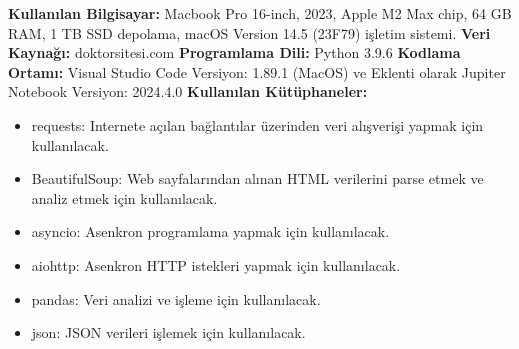 \textbf{Kullanılan Bilgisayar:} Macbook Pro 16-inch, 2023, Apple M2 Max chip, 64 GB RAM, 1 TB SSD depolama, macOS Version 14.5 (23F79) işletim sistemi.
\newline
\textbf{Veri Kaynağı:} doktorsitesi.com
\newline
\textbf{Programlama Dili:} Python 3.9.6
\newline
\textbf{Kodlama Ortamı:} Visual Studio Code Versiyon: 1.89.1 (MacOS) ve Eklenti olarak Jupiter Notebook Versiyon: 2024.4.0
\newline
\textbf{Kullanılan Kütüphaneler:}
\begin{itemize}
  \item requests: Internete açılan bağlantılar üzerinden veri alışverişi yapmak için kullanılacak.
  \item BeautifulSoup: Web sayfalarından alınan HTML verilerini parse etmek ve analiz etmek için kullanılacak. \cite{richardson2007beautiful}
  \item asyncio: Asenkron programlama yapmak için kullanılacak.
  \item aiohttp: Asenkron HTTP istekleri yapmak için kullanılacak.
  \item pandas: Veri analizi ve işleme için kullanılacak.
  \item json: JSON verileri işlemek için kullanılacak.
\end{itemize}
